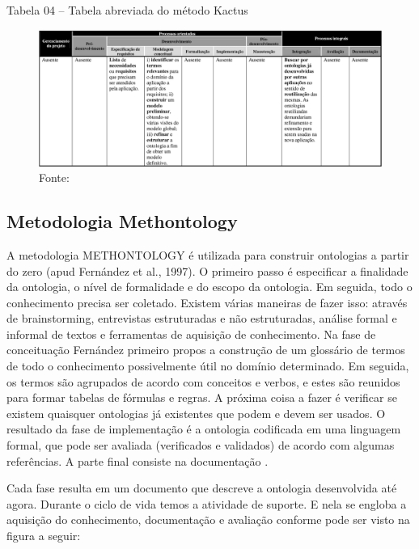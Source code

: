 \pagebreak

Tabela 04 – Tabela abreviada do método Kactus

\begin{figure}[h] 
\centering %
\includegraphics[scale=0.4]{Figuras/7.png} %
\caption{Fonte: \cite{DanielaLucas2008}}
\end{figure}

\subsection{Metodologia Methontology} 
\qquad A metodologia METHONTOLOGY é utilizada para construir ontologias a partir do zero (apud Fernández et al., 1997). O primeiro passo é especificar a finalidade da ontologia, o nível de formalidade e do escopo da ontologia. Em seguida, todo o conhecimento precisa ser coletado. Existem várias maneiras de fazer isso: através de brainstorming, entrevistas estruturadas e não estruturadas, análise formal e informal de textos e ferramentas de aquisição de conhecimento. Na fase de conceituação Fernández  primeiro propos a construção de um glossário de termos de todo o conhecimento possivelmente útil no domínio determinado. Em seguida, os termos são agrupados de acordo com conceitos e verbos, e estes são reunidos para formar tabelas de fórmulas e regras. A próxima coisa a fazer é verificar se existem quaisquer ontologias já existentes que podem e devem ser usados. O resultado da fase de implementação é a ontologia codificada em uma linguagem formal, que pode ser avaliada (verificados e validados) de acordo com algumas referências. A parte final consiste na documentação \cite{VariosAutores2009}. 
 
Cada fase resulta em um documento que descreve a ontologia desenvolvida até agora. Durante o ciclo de vida temos a atividade de suporte. E nela se engloba a aquisição do conhecimento, documentação e avaliação conforme pode ser visto na figura a seguir:

